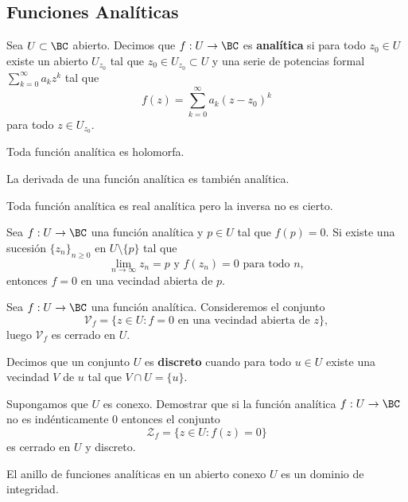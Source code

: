 \subsection{Funciones Anal\'iticas}

Sea $U \subset \BC$ abierto. Decimos que $f: U \to \BC$ es \textbf{anal\'itica} si para todo $z_0 \in U$
existe un abierto $U_{z_0}$ tal que $z_0 \in U_{z_0} \subset U$ y una serie de potencias formal
$\sum_{k = 0}^{\infty} a_k z^k$ tal que
\[
  f(z) = \sum_{k = 0}^{\infty} a_k (z - z_0)^k
\]
para todo $z \in U_{z_0}$.

\begin{theorem}
  Toda funci\'on anal\'itica es holomorfa.
\end{theorem}

\begin{theorem}
  La derivada de una funci\'on anal\'itica es tambi\'en anal\'itica.
\end{theorem}

\begin{remark}
  Toda funci\'on anal\'itica es real anal\'itica pero la inversa no es cierto.
\end{remark}

\begin{theorem}
  Sea $f: U \to \BC$ una funci\'on anal\'itica y $p \in U$ tal que $f(p) = 0$. Si
  existe una sucesi\'on $\{z_n\}_{n \geq 0}$ en $U \setminus \{p\}$ tal que
  \[
    \lim_{n \to \infty} z_n = p \text{ y } f(z_n) = 0 \text{ para todo $n$},
  \]
  entonces $f = 0$ en una vecindad abierta de $p$.
\end{theorem}

\begin{theorem}
  Sea $f: U \to \BC$ una funci\'on anal\'itica. Consideremos el conjunto
  \[
    \mathcal{V}_f = \{z \in U : f = 0 \text{ en una vecindad abierta de } z\},
  \]
  luego $\mathcal{V}_f$ es cerrado en $U$.
\end{theorem}

Decimos que un conjunto $U$ es \textbf{discreto} cuando para todo $u \in U$ existe
una vecindad $V$ de $u$ tal que $V \cap U = \{u\}$.

\begin{theorem}
  Supongamos que $U$ es conexo. Demostrar que si la funci\'on anal\'itica
  $f: U \to \BC$ no es ind\'enticamente $0$ entonces el conjunto
  \[
    \mathcal{Z}_f = \{z \in U: f(z) = 0\}  
  \]
  es cerrado en $U$ y discreto.
\end{theorem}

\begin{theorem}
  El anillo de funciones anal\'iticas en un abierto conexo $U$ es un dominio de integridad.
\end{theorem}

